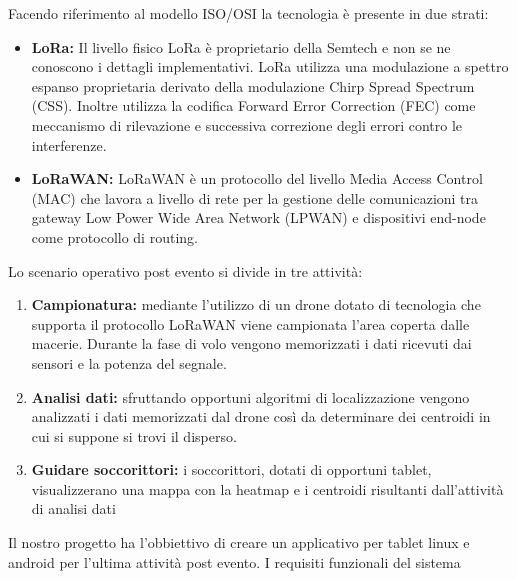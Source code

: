 \documentclass[a4paper]{article}
\begin{document}
Facendo riferimento al modello ISO/OSI la tecnologia è presente in due strati: 
\begin{itemize}
    \item \textbf{LoRa: } Il livello fisico LoRa è proprietario della Semtech e non se ne conoscono i dettagli implementativi.
    LoRa utilizza una modulazione a spettro espanso proprietaria derivato della modulazione Chirp Spread Spectrum (CSS). Inoltre utilizza la codifica Forward Error Correction (FEC) come meccanismo di rilevazione e successiva correzione degli errori contro le interferenze. 
    \item \textbf{LoRaWAN: } LoRaWAN è un protocollo del livello Media Access Control (MAC) che lavora a livello di rete per la gestione delle comunicazioni tra gateway Low Power Wide Area Network (LPWAN) e dispositivi end-node come protocollo di routing.
    \end{itemize}

Lo scenario operativo post evento si divide in tre attività:
\begin{enumerate}[label=\roman{*}., ref=(\roman{*})]
    \item \textbf{Campionatura:} mediante l'utilizzo di un drone dotato di tecnologia che supporta il protocollo LoRaWAN viene campionata l'area coperta dalle macerie. Durante la fase di volo vengono memorizzati i dati ricevuti dai sensori e la potenza del segnale.
    \item \textbf{Analisi dati:} sfruttando opportuni algoritmi di localizzazione vengono analizzati i dati memorizzati dal drone così da determinare dei centroidi in cui si suppone si trovi il disperso. 
    \item \textbf{Guidare soccorittori:} i soccorittori, dotati di opportuni tablet, visualizzerano una mappa con la heatmap e i centroidi risultanti dall'attività di analisi dati
    \end{enumerate}

Il nostro progetto ha l'obbiettivo di creare un applicativo per tablet linux e android per l'ultima attività post evento.\newline 
I requisiti funzionali del sistema 
\end{document}
